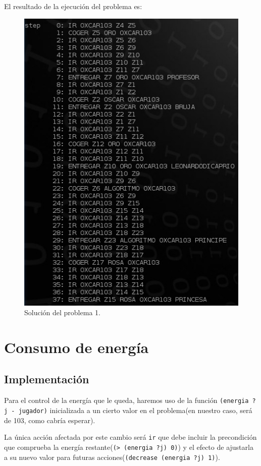 \documentclass[a4paper, 11pt]{article}
\begin{document}
		El resultado de la ejecución del problema es:
		\begin{figure}[H]
			\centering
			\includegraphics[width=15cm]{Problema1.jpg}
			\caption{Solución del problema 1.}
			\label{Prob-1}
		\end{figure}
		
\section{Consumo de energía}
	\subsection{Implementación}
		Para el control de la energía que le queda, haremos uso de la función \verb|(energia ?j - jugador)|
		inicializada a un cierto valor en el problema(en nuestro caso, será de 103, como cabría esperar).
		
		La única acción afectada por este cambio será \verb|ir| que debe incluir la precondición que comprueba
		la energía restante(\verb|(> (energia ?j) 0)|) y el efecto de ajustarla a su nuevo valor para futuras
		acciones(\verb|(decrease (energia ?j) 1)|).
		
\end{document}
